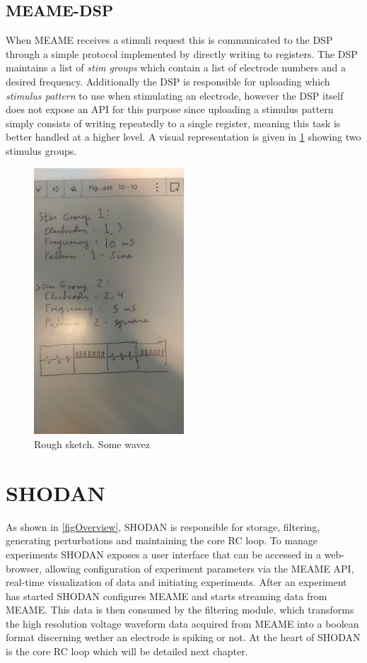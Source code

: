 \subsection{MEAME-DSP}
When MEAME receives a stimuli request this is communicated to the DSP through a
simple protocol implemented by directly writing to registers.
The DSP maintains a list of \emph{stim groups} which contain a list of electrode
numbers and a desired frequency.
Additionally the DSP is responsible for uploading which \emph{stimulus pattern}
to use when stimulating an electrode, however the DSP itself does not expose an
API for this purpose since uploading a stimulus pattern simply consists of
writing repeatedly to a single register, meaning this task is better handled at
a higher level.
A visual representation is given in \ref{figWaves} showing two stimulus groups.
\begin{figure}[h!]
  \centering
  \includegraphics[width=0.5\textwidth]{fig/rm/dsp_config.jpg}
  \caption{Rough sketch.
    Some wavez
  }
  \label{figWaves}
\end{figure}
\section{SHODAN}
As shown in \ref{figOverview}, SHODAN is responsible for storage, filtering,
generating perturbations and maintaining the core RC loop.
To manage experiments SHODAN exposes a user interface that can be accessed in a
web-browser, allowing configuration of experiment parameters via the MEAME API,
real-time visualization of data and initiating experiments.
After an experiment has started SHODAN configures MEAME and starts streaming
data from MEAME.
This data is then consumed by the filtering module, which transforms the
high resolution voltage waveform data acquired from MEAME into a boolean format
discerning wether an electrode is spiking or not.
At the heart of SHODAN is the core RC loop which will be detailed next chapter.
\cleardoublepage

